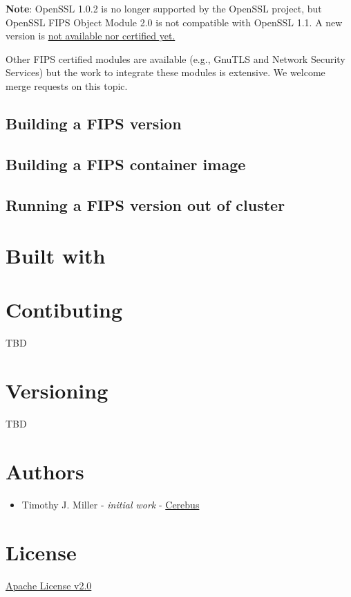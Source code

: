 \documentclass[11pt]{article}
\begin{document}
\textbf{Note}: OpenSSL 1.0.2 is no longer supported by the OpenSSL project, but OpenSSL FIPS Object Module 2.0 is not compatible with OpenSSL 1.1.  A new version is \href{https://www.openssl.org/blog/blog/2018/09/25/fips/}{not available nor certified yet.}

Other FIPS certified modules are available (e.g., GnuTLS and Network Security Services) but the work to integrate these modules is extensive.  We welcome merge requests on this topic.

\subsection{Building a FIPS version}
\label{sec:org7f2ebc0}

\subsection{Building a FIPS container image}
\label{sec:org2e58573}

\subsection{Running a FIPS version out of cluster}
\label{sec:org33ac29c}

\section{Built with}
\label{sec:orgbbdf78a}

\section{Contibuting}
\label{sec:orge1205d5}
TBD
\section{Versioning}
\label{sec:orge329c77}
TBD
\section{Authors}
\label{sec:org29dba9c}
\begin{itemize}
\item Timothy J. Miller - \emph{initial work} - \href{https://github.com/Cerebus}{Cerebus}
\end{itemize}
\section{License}
\label{sec:orga6ffb93}
\href{./LICENSE}{Apache License v2.0}
\end{document}
